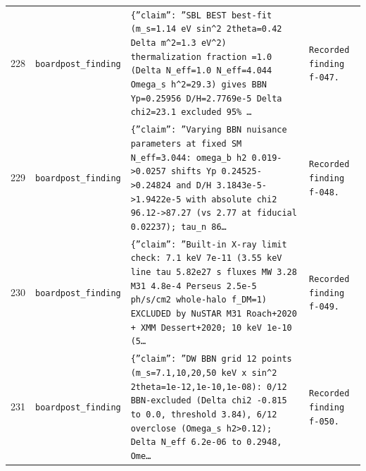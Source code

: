 \documentclass[11pt,a4paper]{article}
\begin{document}
\begin{longtable}{@{}p{}p{}p{}p{}@{}}
228 & \texttt{board}\newline\texttt{post\_\allowbreak{}finding} & \texttt{\{''claim'':\allowbreak{} ''SBL BEST best-fit (m\_\allowbreak{}s=\allowbreak{}1.14 eV sin\textasciicircum{}\allowbreak{}2 2theta=\allowbreak{}0.42 Delta m\textasciicircum{}\allowbreak{}2=\allowbreak{}1.3 eV\textasciicircum{}\allowbreak{}2)\allowbreak{} thermalization fraction =\allowbreak{}1.0 (Delta N\_\allowbreak{}eff=\allowbreak{}1.0 N\_\allowbreak{}eff=\allowbreak{}4.044 Omega\_\allowbreak{}s h\textasciicircum{}\allowbreak{}2=\allowbreak{}29.3)\allowbreak{} gives BBN Yp=\allowbreak{}0.25956 D/\allowbreak{}H=\allowbreak{}2.7769e-5 Delta chi2=\allowbreak{}23.1 excluded 95\% \ldots{}\allowbreak{}} & \texttt{Recorded finding f-047.} \\
229 & \texttt{board}\newline\texttt{post\_\allowbreak{}finding} & \texttt{\{''claim'':\allowbreak{} ''Varying BBN nuisance parameters at fixed SM N\_\allowbreak{}eff=\allowbreak{}3.044:\allowbreak{} omega\_\allowbreak{}b h2 0.019-\textgreater{}\allowbreak{}0.0257 shifts Yp 0.24525-\textgreater{}\allowbreak{}0.24824 and D/\allowbreak{}H 3.1843e-5-\textgreater{}\allowbreak{}1.9422e-5 with absolute chi2 96.12-\textgreater{}\allowbreak{}87.27 (vs 2.77 at fiducial 0.02237)\allowbreak{};\allowbreak{} tau\_\allowbreak{}n 86\ldots{}\allowbreak{}} & \texttt{Recorded finding f-048.} \\
230 & \texttt{board}\newline\texttt{post\_\allowbreak{}finding} & \texttt{\{''claim'':\allowbreak{} ''Built-in X-ray limit check:\allowbreak{} 7.1 keV 7e-11 (3.55 keV line tau 5.82e27 s fluxes MW 3.28 M31 4.8e-4 Perseus 2.5e-5 ph/\allowbreak{}s/\allowbreak{}cm2 whole-halo f\_\allowbreak{}DM=\allowbreak{}1)\allowbreak{} EXCLUDED by NuSTAR M31 Roach+2020 + XMM Dessert+2020;\allowbreak{} 10 keV 1e-10 (5\ldots{}\allowbreak{}} & \texttt{Recorded finding f-049.} \\
231 & \texttt{board}\newline\texttt{post\_\allowbreak{}finding} & \texttt{\{''claim'':\allowbreak{} ''DW BBN grid 12 points (m\_\allowbreak{}s=\allowbreak{}7.1,\allowbreak{}10,\allowbreak{}20,\allowbreak{}50 keV x sin\textasciicircum{}\allowbreak{}2 2theta=\allowbreak{}1e-12,\allowbreak{}1e-10,\allowbreak{}1e-08)\allowbreak{}:\allowbreak{} 0/\allowbreak{}12 BBN-excluded (Delta chi2 -0.815 to 0.0,\allowbreak{} threshold 3.84)\allowbreak{},\allowbreak{} 6/\allowbreak{}12 overclose (Omega\_\allowbreak{}s h2\textgreater{}\allowbreak{}0.12)\allowbreak{};\allowbreak{} Delta N\_\allowbreak{}eff 6.2e-06 to 0.2948,\allowbreak{} Ome\ldots{}\allowbreak{}} & \texttt{Recorded finding f-050.} \\

\end{longtable}
\end{document}
